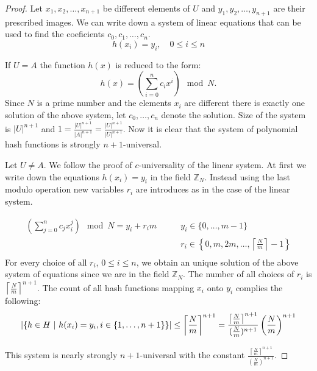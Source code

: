 \begin{proof}
Let $x_1, x_2, \dots, x_{n+1}$ be different elements of $U$ and $y_1, y_2, \dots, y_{n+1}$ are their prescribed images. We can write down a system of linear equations that can be used to find the coeficients $c_0, c_1, \dots, c_n$.
\[ 
h(x_i) = y_i, \quad 0 \leq i \leq n 
\]

If $U = A$ the function $h(x)$ is reduced to the form: \[ h(x) = \left( \displaystyle \sum_{i=0}^{n} c_i x^i \right) \mod N \textit{.} \] Since $N$ is a prime number and the elements $x_i$ are different there is exactly one solution of the above system, let $c_0, \dots, c_n$ denote the solution. Size of the system is ${|U|}^{n+1}$ and $1 = \frac{|U| ^ {n + 1}}{|A|^{n + 1}} = \frac{|U| ^ {n + 1}}{|U|^{n + 1}}$. Now it is clear that the system of polynomial hash functions is strongly $n + 1$-universal.

Let $U \neq A$. We follow the proof of $c$-universality of the linear system. At first we write down the equations $h(x_i) = y_i$ in the field $\mathbb{Z}_N$. Instead using the last modulo operation new variables $r_i$ are introduces as in the case of the linear system.

\begin{displaymath}
\begin{split}
\left(\displaystyle \sum_{j=0}^{n} c_j x_{i}^{j} \right) \mod N = {y}_i + {r_i}{m} \qquad 
 & y_i \in \{0, \dots, m - 1 \} \\
 & r_i \in \left\{0, m, 2m, \dots, \left\lceil \frac{N}{m} \right\rceil - 1 \right\} \\
\end{split}
\end{displaymath}
For every choice of all $r_i$, $0 \leq i \leq n$, we obtain an unique solution of the above system of equations since we are in the field $\mathbb{Z}_N$. The number of all choices of $r_i$ is ${\left\lceil \frac{N}{m} \right\rceil}^{n + 1}$. The count of all hash functions mapping $x_i$ onto $y_i$ complies the following:
\begin{displaymath}
|\{h \in H \ | \  h(x_i) = y_i, i \in \{1, \dots, n + 1\}\}| \leq {\left\lceil \frac{N}{m} \right\rceil}^{n + 1} = \frac{{\left\lceil \frac{N}{m} \right\rceil}^{n + 1}}{(\frac{N}{m})^{n+1}}\left(\frac{N}{m}\right)^{n+1}
\end{displaymath}

This system is nearly strongly $n+1$-universal with the constant $\frac{{\left\lceil \frac{N}{m} \right\rceil}^{n + 1}}{(\frac{N}{m})^{n+1}}$.
\end{proof}

